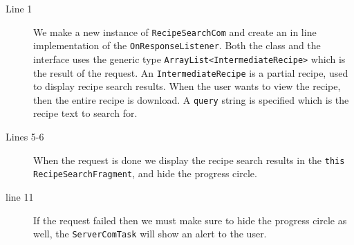 \begin{description}
\item[Line 1] We make a new instance of \lstinline|RecipeSearchCom| and create an in line implementation of the \lstinline|OnResponseListener|. Both the class and the interface uses the generic type \lstinline|ArrayList<IntermediateRecipe>| which is the result of the request. An \lstinline|IntermediateRecipe| is a partial recipe, used to display recipe search results. When the user wants to view the recipe, then the entire recipe is download.  A \lstinline|query| string is specified which is the recipe text to search for.
\item[Lines 5-6] When the request is done we display the recipe search results in the \lstinline|this| \lstinline|RecipeSearchFragment|, and hide the progress circle.
\item[line 11] If the request failed then we must make sure to hide the progress circle as well, the \lstinline|ServerComTask| will show an alert to the user.
\end{description}
